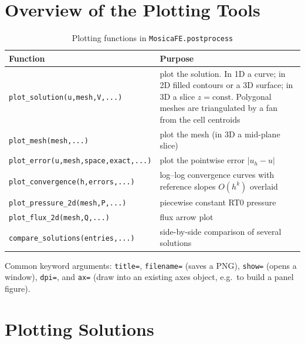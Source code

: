 \documentclass[11pt,oneside]{book}
\theoremstyle{definition}
\theoremstyle{plain}
\newcommand{\code}[1]{\texttt{#1}}
\newcommand{\module}[1]{\texttt{MosicaFE.#1}}
\begin{document}
\section{Overview of the Plotting Tools}

\begin{table}[htbp]
\centering
\caption{Plotting functions in \module{postprocess}}
\label{tab:plots}
\begin{lrbox}{\guideTableBox}
\begin{tabular}{@{}L{5.6cm}L{9.8cm}@{}}
\toprule
Function & Purpose \\
\midrule
\code{plot\_\allowbreak solution(u,\allowbreak  mesh,\allowbreak  V,\allowbreak  ...)} & plot the solution. In 1D a curve; in 2D filled contours or a 3D surface;
in 3D a slice $z=\text{const}$. Polygonal meshes are triangulated by a fan from the cell centroids \\
\code{plot\_\allowbreak mesh(mesh,\allowbreak  ...)} & plot the mesh (in 3D a mid-plane slice) \\
\code{plot\_\allowbreak error(u,\allowbreak  mesh,\allowbreak  space,\allowbreak  exact,\allowbreak  ...)} & plot the pointwise error $|u_h-u|$ \\
\code{plot\_\allowbreak convergence(h,\allowbreak  errors,\allowbreak  ...)} & log--log convergence curves with reference slopes $O(h^k)$ overlaid \\
\code{plot\_\allowbreak pressure\_\allowbreak 2d(mesh,\allowbreak  P,\allowbreak  ...)} & piecewise constant RT0 pressure \\
\code{plot\_\allowbreak flux\_\allowbreak 2d(mesh,\allowbreak  Q,\allowbreak  ...)} & flux arrow plot \\
\code{compare\_\allowbreak solutions(entries,\allowbreak  ...)} & side-by-side comparison of several solutions \\
\bottomrule
\end{tabular}
\end{lrbox}%
\ifdim\wd\guideTableBox>\linewidth
  \resizebox{\linewidth}{!}{\usebox{\guideTableBox}}%
\else\usebox{\guideTableBox}\fi
\end{table}

Common keyword arguments: \code{title=}, \code{filename=} (saves a PNG),
\code{show=} (opens a window), \code{dpi=}, and \code{ax=} (draw into an existing
axes object, e.g.\ to build a panel figure).

\section{Plotting Solutions}
\end{document}
